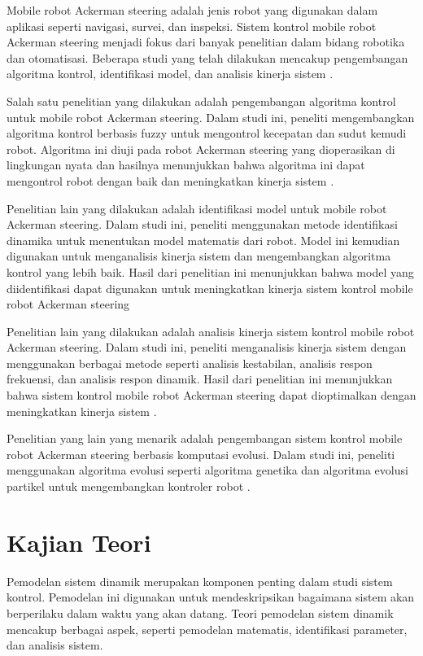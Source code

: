 Mobile robot Ackerman steering adalah jenis robot yang digunakan dalam aplikasi seperti navigasi, survei, dan inspeksi. Sistem kontrol mobile robot Ackerman steering menjadi fokus dari banyak penelitian dalam bidang robotika dan otomatisasi. Beberapa studi yang telah dilakukan mencakup pengembangan algoritma kontrol, identifikasi model, dan analisis kinerja sistem \cite{Diaz2019}.

Salah satu penelitian yang dilakukan adalah pengembangan algoritma kontrol untuk mobile robot Ackerman steering. Dalam studi ini, peneliti mengembangkan algoritma kontrol berbasis fuzzy untuk mengontrol kecepatan dan sudut kemudi robot. Algoritma ini diuji pada robot Ackerman steering yang dioperasikan di lingkungan nyata dan hasilnya menunjukkan bahwa algoritma ini dapat mengontrol robot dengan baik dan meningkatkan kinerja sistem \cite{Barrero2012}.

Penelitian lain yang dilakukan adalah identifikasi model untuk mobile robot Ackerman steering. Dalam studi ini, peneliti menggunakan metode identifikasi dinamika untuk menentukan model matematis dari robot. Model ini kemudian digunakan untuk menganalisis kinerja sistem dan mengembangkan algoritma kontrol yang lebih baik. Hasil dari penelitian ini menunjukkan bahwa model yang diidentifikasi dapat digunakan untuk meningkatkan kinerja sistem kontrol mobile robot Ackerman steering \cite{Economou2003}

Penelitian lain yang dilakukan adalah analisis kinerja sistem kontrol mobile robot Ackerman steering. Dalam studi ini, peneliti menganalisis kinerja sistem dengan menggunakan berbagai metode seperti analisis kestabilan, analisis respon frekuensi, dan analisis respon dinamik. Hasil dari penelitian ini menunjukkan bahwa sistem kontrol mobile robot Ackerman steering dapat dioptimalkan dengan meningkatkan kinerja sistem \cite{Oh2016}.

Penelitian yang lain yang menarik adalah pengembangan sistem kontrol mobile robot Ackerman steering berbasis komputasi evolusi. Dalam studi ini, peneliti menggunakan algoritma evolusi seperti algoritma genetika dan algoritma evolusi partikel untuk mengembangkan kontroler robot \cite{Wang2009}.

\section{Kajian Teori} 
Pemodelan sistem dinamik merupakan komponen penting dalam studi sistem kontrol. Pemodelan ini digunakan untuk mendeskripsikan bagaimana sistem akan berperilaku dalam waktu yang akan datang. Teori pemodelan sistem dinamik mencakup berbagai aspek, seperti pemodelan matematis, identifikasi parameter, dan analisis sistem.

